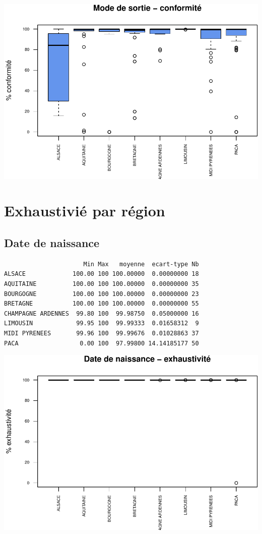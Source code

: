 \documentclass[]{article}
\begin{document}
\includegraphics{septembre2015_files/figure-latex/unnamed-chunk-27-1.pdf}

\section{Exhaustivié par région}\label{exhaustivie-par-region}

\subsection{Date de naissance}\label{date-de-naissance-2}

\begin{verbatim}
                      Min Max   moyenne  ecart-type Nb
ALSACE             100.00 100 100.00000  0.00000000 18
AQUITAINE          100.00 100 100.00000  0.00000000 35
BOURGOGNE          100.00 100 100.00000  0.00000000 23
BRETAGNE           100.00 100 100.00000  0.00000000 55
CHAMPAGNE ARDENNES  99.80 100  99.98750  0.05000000 16
LIMOUSIN            99.95 100  99.99333  0.01658312  9
MIDI PYRENEES       99.96 100  99.99676  0.01028863 37
PACA                 0.00 100  97.99800 14.14185177 50
\end{verbatim}

\includegraphics{septembre2015_files/figure-latex/unnamed-chunk-28-1.pdf}
\end{document}
